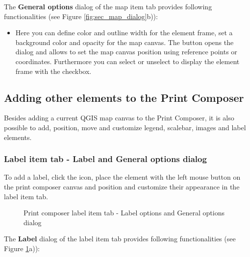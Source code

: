 
The \textbf{General options} dialog of the map item tab provides following
functionalities (see Figure \ref{fig:sec_map_dialog}b)):

\begin{itemize}
\item Here you can define color and outline width for the element frame, set
a background color and opacity for the map canvas. The 
button opens the  dialog and allows to set the map
canvas position using reference points or coordinates. Furthermore you can
select or unselect to display the element frame with the  checkbox. 
\end{itemize}

\subsection{Adding other elements to the Print Composer} 

Besides adding a current QGIS map canvas to the Print Composer, it is also possible 
to add, position, move and customize legend, scalebar, images and label elements.

\subsubsection{Label item tab - Label and General options dialog}

To add a label, click the  icon, place
the element with the left mouse button on the print composer canvas and
position and customize their appearance in the label item tab. 

\begin{figure}[ht]
\centering
\caption{Print composer label item tab - Label options and General options dialog \nixcaption}\label{fig:label_option}
   \goodgap
\end{figure}


The \textbf{Label} dialog of the label item tab provides following
functionalities (see Figure \ref{fig:label_option}a)):

